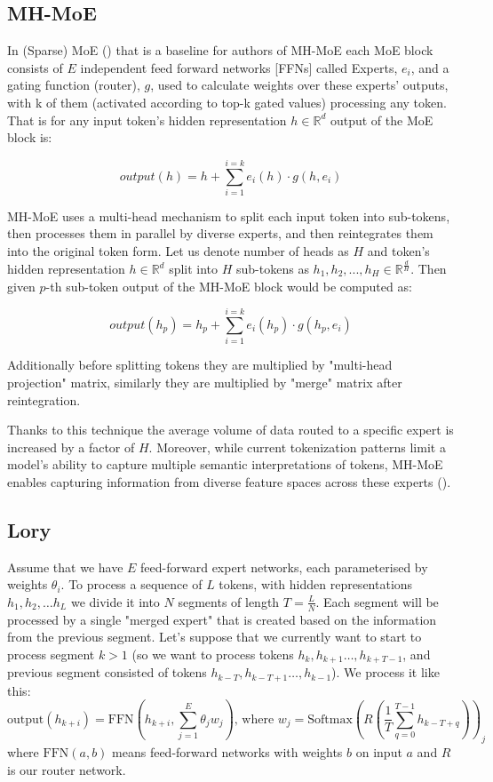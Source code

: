 \documentclass[12pt]{article}
\begin{document}
\subsection{MH-MoE} 
In (Sparse) MoE (\cite{shazeer2017outrageously}) that is a baseline for authors of MH-MoE each MoE block consists of $E$ independent feed forward networks [FFNs] called Experts, $e_i$, and a gating function (router), $g$, used to calculate weights over these experts' outputs, with k of them (activated according to top-k gated values) processing any token. That is for any input token's hidden representation $h \in \mathbb{R}^d$ output of the MoE block is:

\[ output(h)=h+\sum_{i=1}^{i=k} e_i (h)  \cdot g(h, e_i)\]

MH-MoE uses a multi-head mechanism to split each input token into sub-tokens, then processes them in parallel by diverse experts, and then reintegrates them into the original token form. Let us denote number of heads as $H$ and token's hidden representation $h \in \mathbb{R}^d $ split into $H$ sub-tokens as $h_1,h_2,...,h_H \in \mathbb{R}^{\frac{d}{H}} $. Then given $p$-th sub-token output of the MH-MoE block would be computed as:

\[ output(h_p)= h_p + \sum_{i=1}^{i=k} e_i (h_p)  \cdot g(h_p,e_i)\]

Additionally before splitting tokens they are multiplied by "multi-head projection" matrix, similarly they are multiplied by "merge" matrix after reintegration.

Thanks to this technique the average volume of data routed to a specific expert is increased by a factor of $H$.
Moreover, while current tokenization patterns limit a model's ability to capture multiple semantic interpretations of tokens, MH-MoE enables capturing information from diverse feature spaces across these experts (\cite{wu2024multihead}).


\subsection{Lory}
Assume that we have $E$ feed-forward expert networks, each parameterised by weights $\theta_i$. To process a sequence of $L$ tokens, with hidden representations $h_1, h_2, \dots h_L$ we divide it into $N$ segments of length $T = \frac{L}{N}$. Each segment will be processed by a single "merged expert" that is created based on the information from the previous segment. Let's suppose that we currently want to start to process segment $k>1$ (so we want to process tokens $h_k, h_{k+1}\dots ,h_{k+T -1}$, and previous segment consisted of tokens $h_{k - T}, h_{k-T+1}\dots ,h_{k-1}$). We process it like this:
\[\text{output}(h_{k + i}) = \text{FFN}(h_{k+i}, \sum_{j=1}^E \theta_j w_j) \text{,   where  } w_j = \text{Softmax}(R(\frac{1}{T}\sum_{q = 0}^{T-1}h_{k-T+q}))_j\] where $\text{FFN}(a, b)$ means feed-forward networks with weights $b$ on input $a$ and $R$ is our router network.
\end{document}
